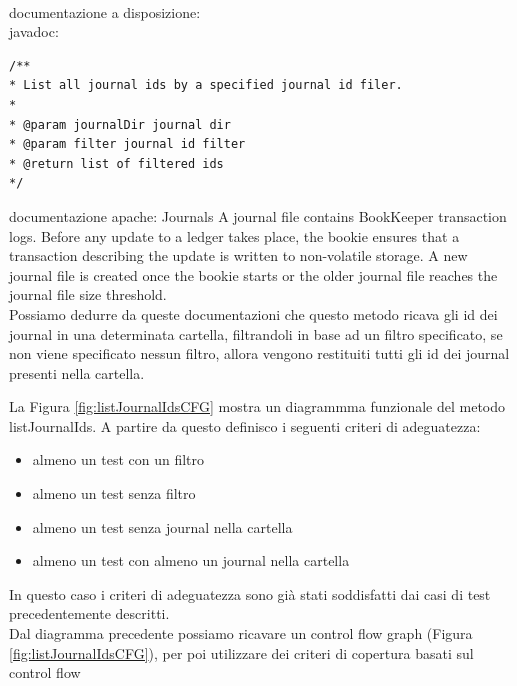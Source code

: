 \documentclass[12pt, a4paper]{article}
\begin{document}
\paragraph{} 
documentazione a disposizione:  \\
javadoc:
\begin{verbatim}
/**
* List all journal ids by a specified journal id filer.
*
* @param journalDir journal dir
* @param filter journal id filter
* @return list of filtered ids
*/
\end{verbatim}

 documentazione apache:
 Journals
A journal file contains BookKeeper transaction logs. 
Before any update to a ledger takes place, the bookie ensures that a transaction describing 
the update is written to non-volatile storage. A new journal file is created once the bookie 
starts or the older journal file reaches the journal file size threshold. \\

Possiamo dedurre da queste documentazioni che questo metodo ricava gli id dei journal in una 
determinata cartella, filtrandoli in base ad un filtro specificato, se non viene specificato 
nessun filtro, allora vengono restituiti tutti gli id dei journal presenti nella cartella.

La Figura \ref{fig:listJournalIdsCFG} mostra un diagrammma 
funzionale del metodo listJournalIds.
A partire da questo definisco i seguenti criteri di adeguatezza:
\begin{itemize}
  \item almeno un test con un filtro
  \item almeno un test senza filtro
  \item almeno un test senza journal nella cartella
  \item almeno un test con almeno un journal nella cartella
\end{itemize}
In questo caso i criteri di adeguatezza sono già stati soddisfatti 
dai casi di test precedentemente descritti. \\



Dal diagramma precedente possiamo 
ricavare un control flow graph (Figura \ref{fig:listJournalIdsCFG}), per poi
utilizzare dei criteri di copertura basati sul control flow
\end{document}
